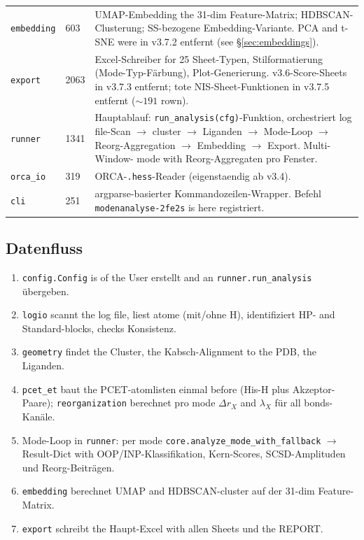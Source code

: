 \documentclass[11pt,a4paper,twoside]{article}
\theoremstyle{remark}
\begin{document}
\begin{longtable}{p{} p{} p{}}
\texttt{embedding} & 603 & UMAP-Embedding the 31-dim
  Feature-Matrix; HDBSCAN-Clusterung; SS-bezogene
  Embedding-Variante. PCA and t-SNE were in v3.7.2 entfernt
  (see \S\ref{sec:embeddings}). \\

\texttt{export} & 2063 & Excel-Schreiber for 25 Sheet-Typen,
  Stilformatierung (Mode-Typ-F\"arbung), Plot-Generierung.
  v3.6-Score-Sheets in v3.7.3 entfernt; tote NIS-Sheet-Funktionen
  in v3.7.5 entfernt ($\sim 191$ rown). \\

\texttt{runner} & 1341 & Hauptablauf:
  \texttt{run\_analysis(cfg)}-Funktion, orchestriert log file-Scan
  $\to$ cluster $\to$ Liganden $\to$ Mode-Loop $\to$
  Reorg-Aggregation $\to$ Embedding $\to$ Export. Multi-Window-
  mode with Reorg-Aggregaten pro Fenster. \\

\texttt{orca\_io} & 319 & ORCA-\texttt{.hess}-Reader (eigenstaendig
  ab v3.4). \\

\texttt{cli} & 251 & argparse-basierter Kommandozeilen-Wrapper.
  Befehl \texttt{modenanalyse-2fe2s} is here registriert. \\

\bottomrule
\end{longtable}

\subsection{Datenfluss}

\begin{enumerate}
  \item \texttt{config.Config} is of the User erstellt and an
        \texttt{runner.run\_analysis} \"ubergeben.
  \item \texttt{logio} scannt the log file, liest atome (mit/ohne H),
        identifiziert HP- and Standard-blocks, checks
        Konsistenz.
  \item \texttt{geometry} findet the Cluster, the Kabsch-Alignment
        to the PDB, the Liganden.
  \item \texttt{pcet\_et} baut the PCET-atomlisten einmal before (His-H
        plus Akzeptor-Paare); \texttt{reorganization} berechnet pro
        mode $\Delta r_X$ and $\lambda_X$ f\"ur all bonds-Kan\"ale.
  \item Mode-Loop in \texttt{runner}: per mode
        \texttt{core.analyze\_mode\_with\_fallback} $\to$ Result-Dict
        with OOP/INP-Klassifikation, Kern-Scores, SCSD-Amplituden und
        Reorg-Beitr\"agen.
  \item \texttt{embedding} berechnet UMAP and HDBSCAN-cluster auf der
        31-dim Feature-Matrix.
  \item \texttt{export} schreibt the Haupt-Excel with allen Sheets und
        the REPORT.
\end{enumerate}
\end{document}

